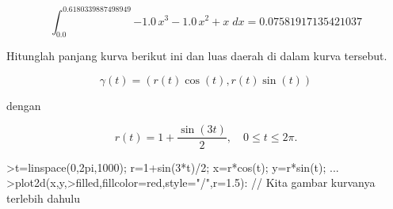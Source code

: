 \documentclass[a4paper,10pt]{article}
\begin{document}
\begin{eulernotebook}
\begin{eulercomment}
\begin{eulercomment}
\begin{eulercomment}
\begin{eulercomment}
\begin{eulercomment}
\begin{eulercomment}
\begin{eulercomment}
\begin{eulercomment}
\begin{eulerformula}
\[
\int_{0.0}^{0.6180339887498949}{-1.0\,x^3-1.0\,x^2+x\;dx}=  0.07581917135421037
\]
\end{eulerformula}
\begin{eulercomment}
Hitunglah panjang kurva berikut ini dan luas daerah di dalam kurva tersebut.

\end{eulercomment}
\begin{eulerformula}
\[
\gamma(t) = (r(t) \cos(t), r(t) \sin(t))
\]
\end{eulerformula}
\begin{eulercomment}
dengan

\end{eulercomment}
\begin{eulerformula}
\[
r(t) = 1 + \dfrac{\sin(3t)}{2},\quad 0\le t\le 2\pi.
\]
\end{eulerformula}
\begin{eulerprompt}
>t=linspace(0,2pi,1000); r=1+sin(3*t)/2; x=r*cos(t); y=r*sin(t); ...
>plot2d(x,y,>filled,fillcolor=red,style="/",r=1.5): // Kita gambar kurvanya terlebih dahulu
\end{eulerprompt}
\begin{eulerformula}
\[
\]
\end{eulerformula}
\end{eulercomment}
\end{eulercomment}
\end{eulercomment}
\end{eulercomment}
\end{eulercomment}
\end{eulercomment}
\end{eulercomment}
\end{eulercomment}
\end{eulernotebook}
\end{document}
